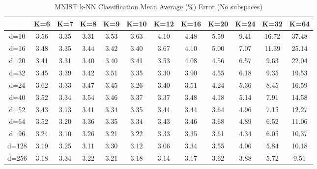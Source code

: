 \begin{table}[H]
\centering
\label{tab:table3}
\begin{tabular}{|c|c|c|c|c|c|c|c|c|c|c|c|}
\hline
& K=6 & K=7 & K=8 & K=9 & K=10 & K=12 & K=16 & K=20 & K=24 & K=32 & K=64 \\
\hline
d=10 & 3.56 & 3.35 & 3.31 & 3.53 & 3.63 & 4.10 & 4.48 & 5.59 & 9.41 & 16.72 & 37.48 \\
d=16 & 3.48 & 3.35 & 3.44 & 3.42 & 3.40 & 3.67 & 4.10 & 5.00 & 7.07 & 11.39 & 25.14 \\
d=20 & 3.41 & 3.31 & 3.40 & 3.40 & 3.41 & 3.53 & 4.08 & 4.56 & 6.57 & 9.63 & 22.04 \\
d=32 & 3.45 & 3.39 & 3.42 & 3.51 & 3.35 & 3.30 & 3.90 & 4.55 & 6.18 & 9.35 & 19.53 \\
d=24 & 3.62 & 3.33 & 3.47 & 3.45 & 3.26 & 3.40 & 3.51 & 4.24 & 5.36 & 8.45 & 16.59 \\
d=40 & 3.52 & 3.34 & 3.54 & 3.46 & 3.37 & 3.37 & 3.48 & 4.18 & 5.14 & 7.91 & 14.58 \\
d=52 & 3.43 & 3.13 & 3.41 & 3.34 & 3.35 & 3.44 & 3.44 & 3.64 & 4.96 & 7.15 & 12.27 \\
d=64 & 3.52 & 3.20 & 3.36 & 3.35 & 3.34 & 3.43 & 3.46 & 3.68 & 4.89 & 6.52 & 11.06 \\
d=96 & 3.24 & 3.10 & 3.26 & 3.21 & 3.22 & 3.33 & 3.35 & 3.61 & 4.34 & 6.05 & 10.37 \\
d=128 & 3.19 & 3.25 & 3.11 & 3.30 & 3.12 & 3.06 & 3.34 & 3.55 & 4.06 & 5.84 & 10.18 \\
d=256 & 3.18 & 3.34 & 3.22 & 3.21 & 3.18 & 3.14 & 3.17 & 3.62 & 3.88 & 5.72 & 9.51 \\
\hline
\end{tabular}
\caption{MNIST k-NN Classification Mean Average (\%) Error (No subspaces)}
\end{table}

